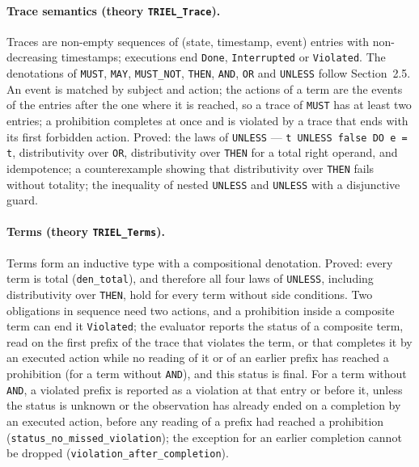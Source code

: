 \documentclass[11pt,a4paper]{article}
\begin{document}
\paragraph{Trace semantics (theory \texttt{TRIEL\_Trace}).}
Traces are non-empty sequences of (state, timestamp, event) entries with non-decreasing
timestamps; executions end \texttt{Done}, \texttt{Interrupted} or \texttt{Violated}. The
denotations of \texttt{MUST}, \texttt{MAY}, \texttt{MUST\_NOT}, \texttt{THEN},
\texttt{AND}, \texttt{OR} and \texttt{UNLESS} follow Section~2.5. An event is matched by
subject and action; the actions of a term are the events of the entries after the one
where it is reached, so a trace of \texttt{MUST} has at least two entries; a prohibition
completes at once and is violated by a trace that ends with its first forbidden action.
Proved: the laws of
\texttt{UNLESS} --- \texttt{t UNLESS false DO e = t}, distributivity over \texttt{OR},
distributivity over \texttt{THEN} for a total right operand, and idempotence; a
counterexample showing that distributivity over \texttt{THEN} fails without totality; the
inequality of nested \texttt{UNLESS} and \texttt{UNLESS} with a disjunctive guard.

\paragraph{Terms (theory \texttt{TRIEL\_Terms}).}
Terms form an inductive type with a compositional denotation. Proved: every term is total
(\texttt{den\_total}), and therefore all four laws of \texttt{UNLESS}, including
distributivity over \texttt{THEN}, hold for every term without side conditions. Two
obligations in sequence need two actions, and a prohibition inside a composite term can
end it \texttt{Violated}; the evaluator reports the status of a composite term, read on
the first prefix of the trace that violates the term, or that completes it by an executed
action while no reading of it or of an earlier prefix has reached a prohibition (for a term
without \texttt{AND}), and this status is final. For a term without \texttt{AND}, a violated prefix is reported as a
violation at that entry or before it, unless the status is unknown or the observation has
already ended on a completion by an executed action, before any reading of a prefix had
reached a prohibition (\texttt{status\_no\_missed\_violation}); the exception for an earlier
completion cannot be dropped (\texttt{violation\_after\_completion}).
\end{document}
